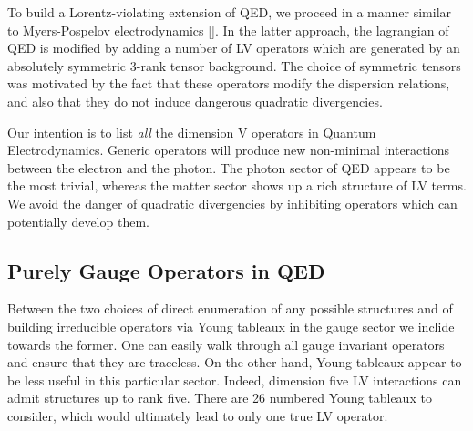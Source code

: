 \documentclass[12pt]{revtex4}
\begin{document}
	To build a Lorentz-violating extension of QED, we proceed in a manner
	similar to Myers-Pospelov electrodynamics [].
	In the latter approach, the lagrangian of QED is modified by adding
	a number of LV operators which are generated by an absolutely
	symmetric 3-rank tensor background.
	The choice of symmetric tensors was motivated by the fact that
	these operators modify the dispersion relations, and also that
	they do not induce dangerous quadratic divergencies.

	Our intention is to list {\it all} the dimension V operators in 
	Quantum Electrodynamics. 
	Generic operators will produce new non-minimal interactions between
	the electron and the photon. 
	The photon sector of QED appears to be the most trivial, whereas
	the matter sector shows up a rich structure of LV terms.
	We avoid the danger of quadratic divergencies by inhibiting operators
	which can potentially develop them.

\subsection{Purely Gauge Operators in QED}

	Between the two choices of direct enumeration of any possible structures
	and of building irreducible operators via Young tableaux in the gauge sector 
	we inclide towards the former.
	One can easily walk through all gauge invariant operators and ensure that
	they are traceless.
	On the other hand, Young tableaux appear to be less useful in this particular
	sector.
	Indeed, dimension five LV interactions can admit structures up to rank five.
	There are 26 numbered Young tableaux to consider, which would 
	ultimately lead to only one true LV operator.
\end{document}
